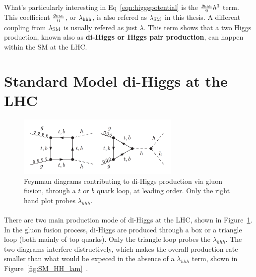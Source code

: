 \paragraph{}
What's particularly interesting in Eq~\ref{eqn:higgspotential} is the $\frac{g_{\rm hhh}}{6}h^3$ term. This coefficient $\frac{g_{\rm hhh}}{6}$, or $\lambda_{\rm hhh}$, is also refered as \textbf{$\lambda_{\rm SM}$} in this thesis.  A different coupling from $\lambda_{\rm SM}$ is usually refered as just $\lambda$. This term shows that a two Higgs production, known also as \textbf{di-Higgs or Higgs pair production}, can happen within the SM at the LHC.


\section{Standard Model di-Higgs at the LHC}

\begin{figure}[h!]
  \centering
  \captionsetup{justification=centering}
  \includegraphics[width=0.7\textwidth]{figures/theory/SM_HH}
  \caption{Feynman diagrams contributing to di-Higgs production via gluon fusion, through a $t$ or $b$ quark loop, at leading order. Only the right hand plot probes $\lambda_{hhh}$.}
  \label{fig:SM_HH}
\end{figure}

\paragraph{}
There are two main production mode of di-Higgs at the LHC, shown in Figure~\ref{fig:SM_HH}. In the gluon fusion process, di-Higgs are produced through a box or a triangle loop (both mainly of top quarks). Only the triangle loop probes the $\lambda_{hhh}$. The two diagrams interfere distructively, which makes the overall production rate smaller than what would be expeced in the absence of a $\lambda_{hhh}$ term, shown in Figure~\ref{fig:SM_HH_lam}~\cite{Frederix:2014hta}. 

